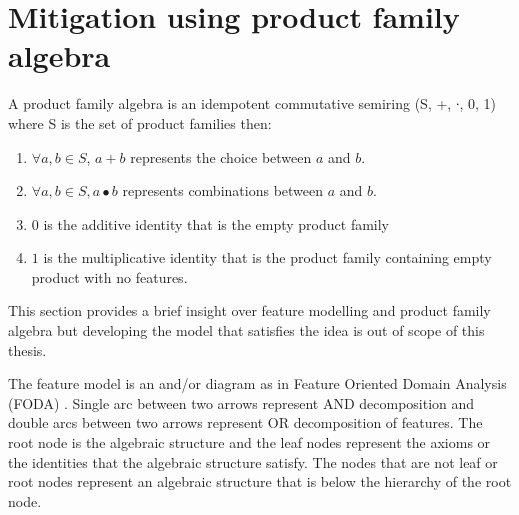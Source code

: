 \section{Mitigation using product family algebra}
A product family algebra is an idempotent commutative semiring (S, +,  ∙, 0, 1)
where S is the set of product families then:
\begin{enumerate}
 \item \(\forall a, b \in S\), $a + b$ represents the choice between $a$ and $b$.
 \item \(\forall a, b \in S, a ∙ b\) represents combinations between $a$ and
 $b$.
 \item $0$ is the additive identity that is the empty product family \\
 \item $1$ is the multiplicative identity that is the product family containing
 empty product with no features.
\end{enumerate}
This section provides a brief insight over feature modelling and product family
algebra but developing the model that satisfies the idea is out of scope of this
thesis.

The feature model is an and/or diagram as in Feature Oriented Domain Analysis
(FODA) \cite{kang1990feature}. Single arc between two arrows represent AND
decomposition and double arcs between two arrows represent OR decomposition of
features. The root node is the algebraic structure and the leaf nodes represent
the axioms or the identities that the algebraic structure satisfy. The nodes
that are not leaf or root nodes represent an algebraic structure that is below
the hierarchy of the root node. 

